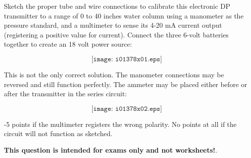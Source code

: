 

Sketch the proper tube and wire connections to calibrate this electronic DP transmitter to a range of 0 to 40 inches water column using a manometer as the pressure standard, and a multimeter to sense its 4-20 mA current output (registering a positive value for current).  Connect the three 6-volt batteries together to create an 18 volt power source:

$$\texttt{[image: i01378x01.eps]}$$







This is not the only correct solution.  The manometer connections may be reversed and still function perfectly.  The ammeter may be placed either before or after the transmitter in the series circuit:

$$\texttt{[image: i01378x02.eps]}$$

-5 points if the multimeter registers the wrong polarity.  No points at all if the circuit will not function as sketched.







{\bf This question is intended for exams only and not worksheets!}.


